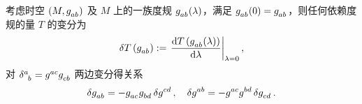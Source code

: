 		\begin{Proof}
			\label{prf_EEq}
			考虑时空 $(M,\tensor{g}{_a_b})$ 及 $M$ 上的一族度规 $\tensor{g}{_a_b}(\lambda)$，满足 $\tensor{g}{_a_b}(0)=\tensor{g}{_a_b}$，则任何依赖度规的量 $T$ 的变分为
			\begin{equation}
				\var T\left( \tensor{g}{_a_b} \right) \definedby \left. \dv{T\left( \tensor{g}{_a_b}(\lambda) \right)}{\lambda}  \right|_{\lambda=0},
			\end{equation}
			对 $\tensor{\delta}{^a_b} = \tensor{g}{^a^c} \tensor{g}{_c_b}$ 两边变分得关系
			\begin{equation}
				\begin{split}
					\var{\tensor{g}{_a_b}} = - \tensor{g}{_a_c} \tensor{g}{_b_d} \var{\tensor{g}{^c^d}} \qc \var{\tensor{g}{^a^b}} = - \tensor{g}{^a^c} \tensor{g}{^b^d} \var{\tensor{g}{_c_d}}.
				\end{split}
			\end{equation}


\end{Proof}
